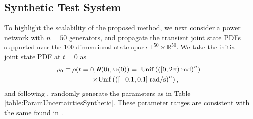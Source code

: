 \documentclass[10pt,twocolumn]{IEEEtran}
\begin{document}
\subsection{Synthetic Test System}\label{subsec:NumSimSynthetic}
To highlight the scalability of the proposed method, we next consider a power network with $n=50$ generators, and propagate the transient joint state PDFs supported over the 100 dimensional state space $\mathbb{T}^{50}\times\mathbb{R}^{50}$. We take the initial joint state PDF at $t=0$ as
\begin{multline}
\rho_{0}\equiv\rho(t=0,\bm{\theta}(0),\bm{\omega}(0)) = \;{\rm{Unif}}\left(\left([0,2\pi)\;\text{rad}\right)^{n}\right) \\
	\qquad\times {\rm{Unif}}\left(\left([-0.1,0.1]\;\text{rad/s}\right)^{n}\right),
\label{rho0synthetic}	
\end{multline}
and following \cite[Sec. 5]{dorfler2012synchronization}, randomly generate the parameters as in Table \ref{table:ParamUncertaintiesSynthetic}. These parameter ranges are consistent with the same found in \cite{sauerpai1998,andersonBook1977,kundurBook1994}.
\end{document}
